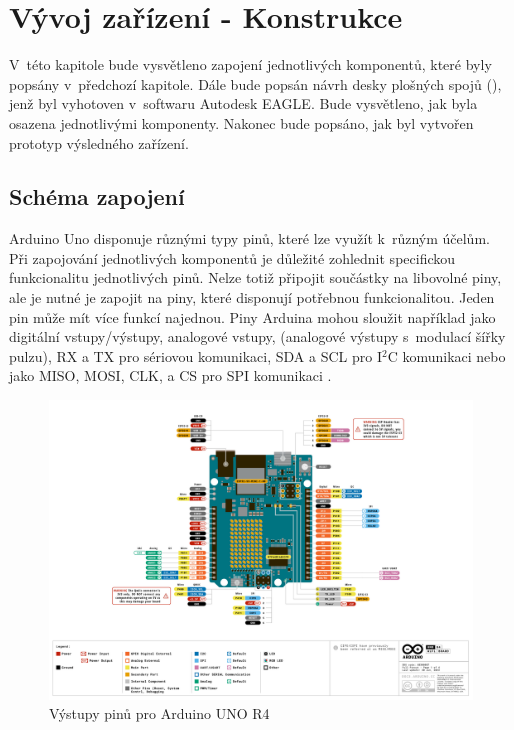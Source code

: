 \chapter{Vývoj zařízení - Konstrukce}
\label{5-vyvoj-zarizeni-konstrukce}
V~této kapitole bude vysvětleno zapojení jednotlivých komponentů, které byly pop\-sány v~předchozí kapitole. Dále bude popsán návrh desky plošných spojů (), jenž byl vyhotoven v~softwaru Autodesk EAGLE. Bude vysvětleno, jak byla  osazena jednotlivými komponenty. Nakonec bude popsáno, jak byl vytvořen prototyp výsledného zařízení.

\section{Schéma zapojení}
Arduino Uno disponuje různými typy pinů, které lze využít k~různým účelům. Při zapojování jednotlivých komponentů je důležité zohlednit specifickou funkcionalitu jednotlivých pinů. Nelze totiž připojit součástky na libovolné piny, ale je nutné je zapojit na piny, které disponují potřebnou funkcionalitou. Jeden pin může mít více funkcí najednou. Piny Arduina mohou sloužit například jako digitální vstupy/výstupy, analogové vstupy,  (analogové výstupy s~modulací šířky pulzu), RX a TX pro sériovou komunikaci, SDA a SCL pro I\(^2\)C komunikaci nebo jako MISO, MOSI, CLK, a CS pro SPI komunikaci \cite{arduino}.

\begin{figure}[H]
	\centering
	\includegraphics[width=14.9cm]{images/pinout_rotated.pdf}
	\caption{Výstupy pinů pro Arduino UNO R4 \cite{arduino}}
\end{figure}

